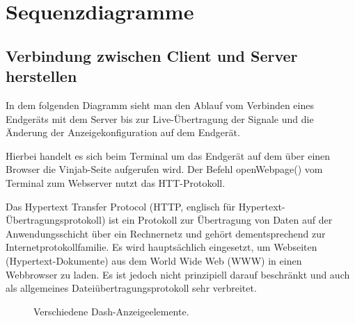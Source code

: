 \documentclass[entwurf.tex]{subfiles}
\begin{document}
\chapter{Sequenzdiagramme}
	\section{Verbindung zwischen Client und Server herstellen}
	\label{Sequence:TerminalConnect}
		In dem folgenden Diagramm sieht man den Ablauf vom Verbinden eines Endgeräts mit dem Server bis zur Live-Übertragung der Signale und die Änderung der Anzeigekonfiguration auf dem Endgerät. 
		
		Hierbei handelt es sich beim Terminal um das Endgerät auf dem über einen Browser die Vinjab-Seite aufgerufen wird. Der Befehl openWebpage() vom Terminal zum Webserver nutzt das HTT-Protokoll. 

		Das Hypertext Transfer Protocol (HTTP, englisch für Hypertext-Übertragungsprotokoll) ist ein Protokoll zur Übertragung von Daten auf der Anwendungsschicht über ein Rechnernetz und gehört dementsprechend zur Internetprotokollfamilie. Es wird hauptsächlich eingesetzt, um Webseiten (Hypertext-Dokumente) aus dem World Wide Web (WWW) in einen Webbrowser zu laden. Es ist jedoch nicht prinzipiell darauf beschränkt und auch als allgemeines Dateiübertragungsprotokoll sehr verbreitet. %
		
		\begin{figure}[H]
  			\caption{Verschiedene Dash-Anzeigeelemente.}
  		\end{figure}
  		
\end{document}
